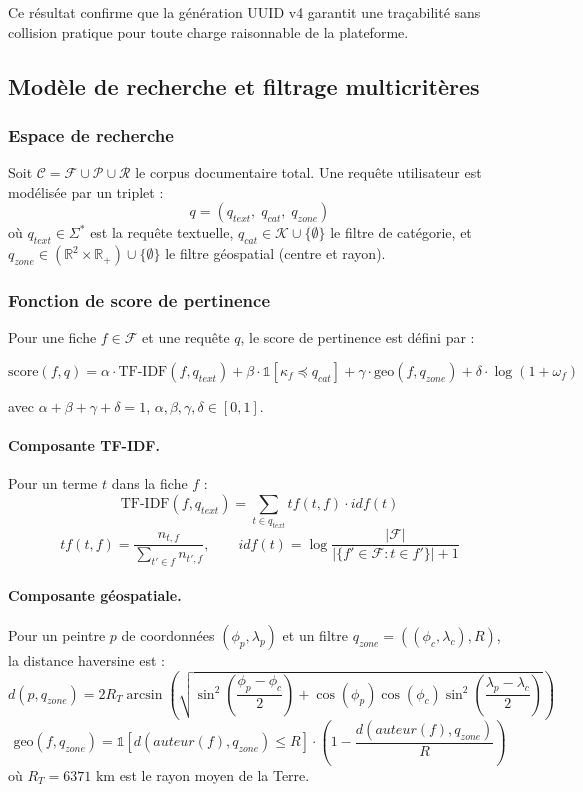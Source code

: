 \documentclass[12pt,a4paper]{report}
\begin{document}
Ce résultat confirme que la génération UUID v4 garantit une traçabilité sans collision
pratique pour toute charge raisonnable de la plateforme.

\subsection{Modèle de recherche et filtrage multicritères}

\subsubsection*{Espace de recherche}

Soit $\mathcal{C} = \mathcal{F} \cup \mathcal{P} \cup \mathcal{R}$ le corpus documentaire total. Une requête
utilisateur est modélisée par un triplet :
\[
q = (q_{text},\; q_{cat},\; q_{zone})
\]
où $q_{text} \in \Sigma^*$ est la requête textuelle, $q_{cat} \in \mathcal{K} \cup \{\emptyset\}$
le filtre de catégorie, et $q_{zone} \in (\mathbb{R}^2 \times \mathbb{R}_+) \cup \{\emptyset\}$
le filtre géospatial (centre et rayon).

\subsubsection*{Fonction de score de pertinence}

Pour une fiche $f \in \mathcal{F}$ et une requête $q$, le score de pertinence est défini par :

\[
\text{score}(f, q) = \alpha \cdot \text{TF-IDF}(f, q_{text}) + \beta \cdot \mathbb{1}[\kappa_f \preceq q_{cat}] + \gamma \cdot \text{geo}(f, q_{zone}) + \delta \cdot \log(1 + \omega_f)
\]

avec $\alpha + \beta + \gamma + \delta = 1$, $\alpha, \beta, \gamma, \delta \in [0,1]$.

\paragraph{Composante TF-IDF.} Pour un terme $t$ dans la fiche $f$ :
\[
\text{TF-IDF}(f, q_{text}) = \sum_{t \in q_{text}} tf(t, f) \cdot idf(t)
\]
\[
tf(t, f) = \frac{n_{t,f}}{\sum_{t' \in f} n_{t',f}}, \qquad idf(t) = \log\frac{|\mathcal{F}|}{|\{f' \in \mathcal{F} : t \in f'\}| + 1}
\]

\paragraph{Composante géospatiale.} Pour un peintre $p$ de coordonnées $(\phi_p, \lambda_p)$
et un filtre $q_{zone} = ((\phi_c, \lambda_c), R)$, la distance haversine est :
\[
d(p, q_{zone}) = 2R_T \arcsin\left(\sqrt{\sin^2\!\left(\frac{\phi_p - \phi_c}{2}\right) + \cos(\phi_p)\cos(\phi_c)\sin^2\!\left(\frac{\lambda_p - \lambda_c}{2}\right)}\right)
\]
\[
\text{geo}(f, q_{zone}) = \mathbb{1}[d(auteur(f), q_{zone}) \leq R] \cdot \left(1 - \frac{d(auteur(f), q_{zone})}{R}\right)
\]
où $R_T = 6371$ km est le rayon moyen de la Terre.
\end{document}
